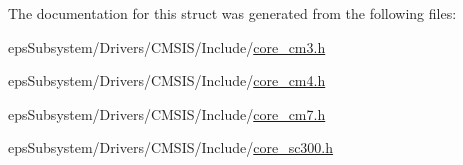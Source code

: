The documentation for this struct was generated from the following files\-:\begin{DoxyCompactItemize}
\item 
eps\-Subsystem/\-Drivers/\-C\-M\-S\-I\-S/\-Include/\hyperlink{core__cm3_8h}{core\-\_\-cm3.\-h}\item 
eps\-Subsystem/\-Drivers/\-C\-M\-S\-I\-S/\-Include/\hyperlink{core__cm4_8h}{core\-\_\-cm4.\-h}\item 
eps\-Subsystem/\-Drivers/\-C\-M\-S\-I\-S/\-Include/\hyperlink{core__cm7_8h}{core\-\_\-cm7.\-h}\item 
eps\-Subsystem/\-Drivers/\-C\-M\-S\-I\-S/\-Include/\hyperlink{core__sc300_8h}{core\-\_\-sc300.\-h}\end{DoxyCompactItemize}

